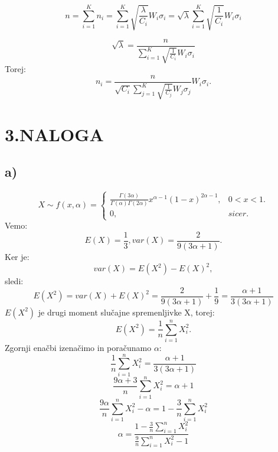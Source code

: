 \documentclass{article}
\begin{document}
\begin{equation*}
n = \sum_{i = 1}^K n_i = \sum_{i=1}^K \sqrt{\frac{\lambda}{C_i}} W_i \sigma_i = \sqrt{\lambda}\sum_{i=1}^K \sqrt{\frac{1}{C_i}} W_i \sigma_i
\end{equation*}

\begin{equation*}
\sqrt{\lambda}  =\frac{n}{\sum_{i=1}^K \sqrt{\frac{1}{C_i}} W_i \sigma_i}
\end{equation*}
Torej:
\begin{equation*}
n_i = \frac{n}{\sqrt{C_i}\sum_{j=1}^K \sqrt{\frac{1}{C_j}} W_j \sigma_j} W_i \sigma_i.
\end{equation*}



\section*{3.NALOGA}
\subsection*{a)}
\begin{equation*}
X\sim f(x,\alpha) =\begin{cases}
 \frac{\Gamma(3\alpha)}{\Gamma(\alpha)\Gamma(2\alpha)} x^{\alpha-1}(1-x)^{2\alpha-1}, & 0<x<1.\\
0, & sicer.
\end{cases}
\end{equation*}
Vemo: 
\begin{equation*}
E(X) = \frac{1}{3}, var(X) = \frac{2}{9(3\alpha+1)}.
\end{equation*}
Ker je:
\begin{equation*}
var(X)=E(X^2)-E(X)^2,
\end{equation*}
sledi: 
\begin{equation*}
E(X^2) = var(X) + E(X)^2 = \frac{2}{9(3\alpha+1)} + \frac{1}{9} = 
\frac{\alpha +1}{3(3\alpha+1)}
\end{equation*}
$E(X^2)$ je drugi moment slučajne spremenljivke X, torej:
\begin{equation*}
E(X^2) = \frac{1}{n} \sum_{i=1}^n X_i^2.
\end{equation*}
Zgornji enačbi izenačimo in poračunamo $\alpha$:
\begin{equation*}
 \frac{1}{n} \sum_{i=1}^n X_i^2 = \frac{\alpha +1}{3(3\alpha+1)}
\end{equation*}
\begin{equation*}
\frac{9\alpha+3}{n} \sum_{i=1}^n X_i^2 = \alpha +1
\end{equation*}
\begin{equation*}
\frac{9\alpha}{n} \sum_{i=1}^n X_i^2  - \alpha = 1 - \frac{3}{n}\sum_{i=1}^n X_i^2
\end{equation*}
\begin{equation*}
\alpha = \frac{1 - \frac{3}{n}\sum_{i=1}^n X_i^2}{\frac{9}{n} \sum_{i=1}^n X_i^2  - 1}
\end{equation*}
\end{document}
